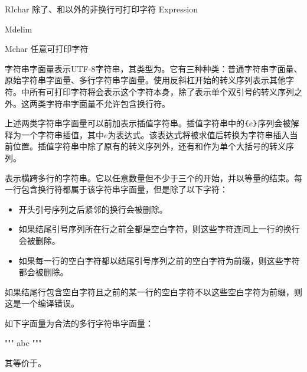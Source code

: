 \begin{bnf}{RIchar}
    \textnormal{除了、\terminal{\{}和\terminal{\}}以外的非换行可打印字符} \br
     \br
    \terminal{\{} Expression \terminal{\}} \br
    \terminal{\{\{} \br
    \terminal{\}\}}
\end{bnf}

\begin{bnf}{Mdelim}
     \bnfs
\end{bnf}

\begin{bnf}{Mchar}
    \textnormal{任意可打印字符}
\end{bnf}

\pnum
字符串字面量表示UTF-8字符串，其类型为。它有三种种类：普通字符串字面量、原始字符串字面量、多行字符串字面量。使用反斜杠开始的转义序列表示其他字符。中所有可打印字符将会表示这个字符本身，除了表示单个双引号的转义序列之外。这两类字符串字面量不允许包含换行符。

\pnum
上述两类字符串字面量可以前加\tcode{\$}表示插值字符串。插值字符串中的$\texttt{\{}e\texttt{\}}$序列会被解释为一个字符串插值，其中$e$为表达式。该表达式将被求值后转换为字符串插入当前位置。插值字符串中除了原有的转义序列外，还有\tcode{\{\{}和\tcode{\}\}}作为单个大括号的转义序列。

\pnum
{}表示横跨多行的字符串。它以任意数量但不少于三个的开始，并以等量的结束。每一行包含换行符都属于该字符串字面量，但是除了以下字符：

\begin{itemize}
    \item 开头引号序列之后紧邻的换行会被删除。
    \item 如果结尾引号序列所在行之前全都是空白字符，则这些字符连同上一行的换行会被删除。
    \item 如果每一行的空白字符都以结尾引号序列之前的空白字符为前缀，则这些字符都会被删除。
\end{itemize}

如果结尾行包含空白字符且之前的某一行的空白字符不以这些空白字符为前缀，则这是一个编译错误。

\enterexample

如下字面量为合法的多行字符串字面量：

\begin{codeblock}
"""
abc
"""
\end{codeblock}

其等价于。

